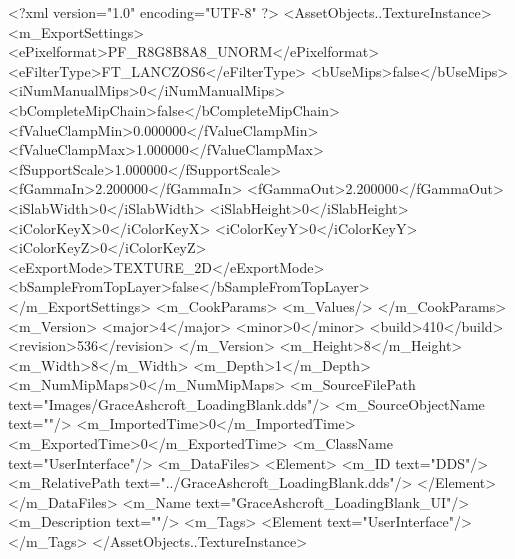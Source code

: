 <?xml version="1.0" encoding="UTF-8" ?>
<AssetObjects..TextureInstance>
	<m_ExportSettings>
		<ePixelformat>PF_R8G8B8A8_UNORM</ePixelformat>
		<eFilterType>FT_LANCZOS6</eFilterType>
		<bUseMips>false</bUseMips>
		<iNumManualMips>0</iNumManualMips>
		<bCompleteMipChain>false</bCompleteMipChain>
		<fValueClampMin>0.000000</fValueClampMin>
		<fValueClampMax>1.000000</fValueClampMax>
		<fSupportScale>1.000000</fSupportScale>
		<fGammaIn>2.200000</fGammaIn>
		<fGammaOut>2.200000</fGammaOut>
		<iSlabWidth>0</iSlabWidth>
		<iSlabHeight>0</iSlabHeight>
		<iColorKeyX>0</iColorKeyX>
		<iColorKeyY>0</iColorKeyY>
		<iColorKeyZ>0</iColorKeyZ>
		<eExportMode>TEXTURE_2D</eExportMode>
		<bSampleFromTopLayer>false</bSampleFromTopLayer>
	</m_ExportSettings>
	<m_CookParams>
		<m_Values/>
	</m_CookParams>
	<m_Version>
		<major>4</major>
		<minor>0</minor>
		<build>410</build>
		<revision>536</revision>
	</m_Version>
	<m_Height>8</m_Height>
	<m_Width>8</m_Width>
	<m_Depth>1</m_Depth>
	<m_NumMipMaps>0</m_NumMipMaps>
	<m_SourceFilePath text="Images/GraceAshcroft_LoadingBlank.dds"/>
	<m_SourceObjectName text=""/>
	<m_ImportedTime>0</m_ImportedTime>
	<m_ExportedTime>0</m_ExportedTime>
	<m_ClassName text="UserInterface"/>
	<m_DataFiles>
		<Element>
			<m_ID text="DDS"/>
			<m_RelativePath text="../GraceAshcroft_LoadingBlank.dds"/>
		</Element>
	</m_DataFiles>
	<m_Name text="GraceAshcroft_LoadingBlank_UI"/>
	<m_Description text=""/>
	<m_Tags>
		<Element text="UserInterface"/>
	</m_Tags>
</AssetObjects..TextureInstance>
